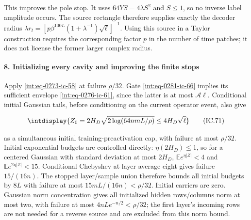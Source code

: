 
This improves the pole stop. It uses \(64YS=4\lambda S^2\) and \(S\le1\), so no inverse label amplitude occurs. The source rectangle therefore supplies exactly the decoder radius \(\lambda r_t=[p\beta^{100L}(1+\lambda^{-1})\sqrt\ell]^{-1}\). Using this source in a Taylor construction requires the corresponding factor \(p\) in the number of time patches; it does not license the former larger complex radius.


\paragraph{8. Initializing every cavity and improving the finite stops}

\mbox{}\par\smallskip


Apply \eqref{int:eq-0273-ic-58} at failure \(\rho/32\). Gate \eqref{int:eq-0281-ic-66} implies its sufficient envelope \eqref{int:eq-0276-ic-61}, since the latter is at most \(\mathcal A\ell\). Conditional initial Gaussian tails, before conditioning on the current operator event, also give


\begingroup\renewcommand{\theHequation}{intdisplay.666}
\begin{equation}
\intdisplay{
Z_0=2H_D\sqrt{2\log(64nmL/\rho)}\le4H_D\sqrt\ell
}
\tag{IC.71}
\label{int:eq-0286-ic-71}
\end{equation}
\endgroup


as a simultaneous initial training-preactivation cap, with failure at most \(\rho/32\). Initial exponential budgets are controlled directly: \(\eta(2H_D)\le1\), so for a centered Gaussian with standard deviation at most \(2H_D\), \(\mathbb E e^{\eta|Z|}<4\) and \(\mathbb E e^{2\eta|Z|}<15\). Conditional Chebyshev at layer average eight gives failure \(15/(16n)\). The stopped layer/sample union therefore bounds all initial budgets by \(8L\) with failure at most \(15mL/(16n)<\rho/32\). Initial carriers are zero. Gaussian norm concentration gives all initialized hidden rows/columns norm at most two, with failure at most \(4nLe^{-n/2}<\rho/32\); the first layer's incoming rows are not needed for a reverse source and are excluded from this norm bound.



